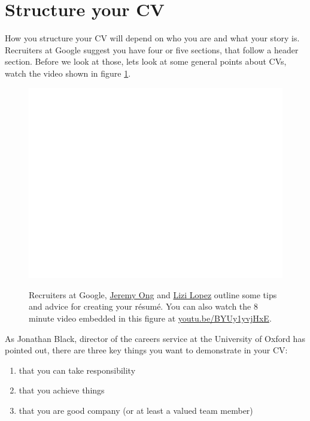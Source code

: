 \documentclass[
]{book}
\providecommand{\tightlist}{%
  \setlength{\itemsep}{0pt}\setlength{\parskip}{0pt}}
\begin{document}
\hypertarget{mycvst}{%
\section{Structure your CV}\label{mycvst}}

How you structure your CV will depend on who you are and what your story is. Recruiters at Google suggest you have four or five sections, that follow a header section. Before we look at those, lets look at some general points about CVs, watch the video shown in figure \ref{fig:lopez-fig}.

\begin{figure}

{\centering \href{https://www.youtube.com/embed/BYUy1yvjHxE}{\includegraphics[width=0.99\linewidth]{cdyf_files/figure-latex/lopez-fig-1} }

}

\caption{Recruiters at Google, \href{https://www.linkedin.com/in/jeremy-ong/}{Jeremy Ong} and \href{https://www.linkedin.com/in/lizilopez/}{Lizi Lopez} outline some tips and advice for creating your résumé. You can also watch the 8 minute video embedded in this figure at \href{https://youtu.be/BYUy1yvjHxE}{youtu.be/BYUy1yvjHxE}. \citep{youtube-google-recruiters}}\label{fig:lopez-fig}
\end{figure}



As Jonathan Black, director of the careers service at the University of Oxford has pointed out, \citep{topnotchcv} there are three key things you want to demonstrate in your CV:

\begin{enumerate}
\def\labelenumi{\arabic{enumi}.}
\tightlist
\item
  that you can take responsibility
\item
  that you achieve things
\item
  that you are good company (or at least a valued team member)
\end{enumerate}
\end{document}
